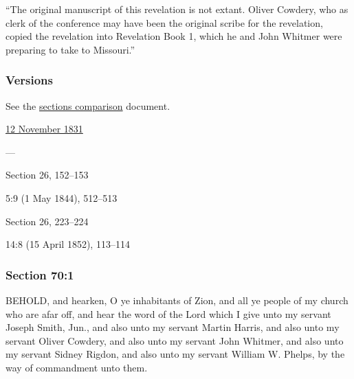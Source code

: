 			``The original manuscript of this revelation is not extant. Oliver Cowdery, who as clerk of the conference may have been the original scribe for the revelation, copied the revelation into Revelation Book 1, which he and John Whitmer were preparing to take to Missouri.''
			
	\subsubsection{Versions}
		\label{DC70-V}
		
		See the \href{https://drive.google.com/file/d/1goAvNz8jS4R8slYfMG_db55Ty2z_vmgK/view?usp=sharing}{sections comparison} document.
	
		\begin{compactdesc}
			\item[JSP] \hyperref[EMS-1831-JS-12-NOV-1831]{12 November 1831}
			\item[BC] ---
			\item[DC 1835] Section 26, 152--153
			\item[TS] 5:9 (1 May 1844), 512--513
			\item[DC 1844] Section 26, 223--224
			\item[MS] 14:8 (15 April 1852), 113--114
		\end{compactdesc}

	\subsubsection{Section 70:1} %
		\label{DC70-1}

		BEHOLD, and hearken, O ye inhabitants of Zion, and all ye people of my church who are afar off, and hear the word of the Lord which I give unto my servant Joseph Smith, Jun., and also unto my servant Martin Harris, and also unto my servant Oliver Cowdery, and also unto my servant John Whitmer, and also unto my servant Sidney Rigdon, and also unto my servant William W. Phelps, by the way of commandment unto them.


